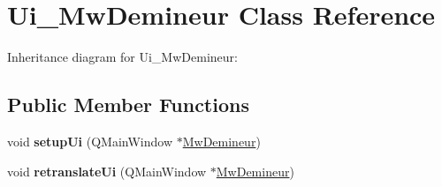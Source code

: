 \hypertarget{class_ui___mw_demineur}{}\section{Ui\+\_\+\+Mw\+Demineur Class Reference}
\label{class_ui___mw_demineur}


Inheritance diagram for Ui\+\_\+\+Mw\+Demineur\+:
\subsection*{Public Member Functions}
\begin{DoxyCompactItemize}
\item 
\mbox{\label{class_ui___mw_demineur_a8917807b4412ad56cc6c7fa598b2dcf2}} 
void {\bfseries setup\+Ui} (Q\+Main\+Window $\ast$\hyperlink{class_mw_demineur}{Mw\+Demineur})
\item 
\mbox{\label{class_ui___mw_demineur_a3e93952e71c1c00b4d6fcbcd3f3b15e2}} 
void {\bfseries retranslate\+Ui} (Q\+Main\+Window $\ast$\hyperlink{class_mw_demineur}{Mw\+Demineur})
\end{DoxyCompactItemize}
